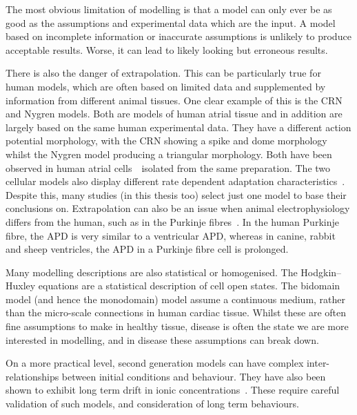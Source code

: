 The most obvious limitation of modelling is that a model can only ever be as
good as the assumptions and experimental data which are the input.
A model based on incomplete information or inaccurate assumptions is unlikely to
produce acceptable results.
Worse, it can lead to likely looking but erroneous results.

There is also the danger of extrapolation.
This can be particularly true for human models, which are often based on limited
data and supplemented by information from different animal tissues.
One clear example of this is the CRN and Nygren models.
Both are models of human atrial tissue and in addition are largely based on the
same human experimental data.
They have a different action potential morphology, with the CRN showing a spike
and dome morphology whilst the Nygren model producing a triangular morphology.
Both have been observed in human atrial cells~\cite{Wang1993}\ isolated from the
same preparation.
The two cellular models also display different rate dependent adaptation
characteristics~\cite{Cherry2007}.
Despite this, many studies (in this thesis too) select just one model to base
their conclusions on.
Extrapolation can also be an issue when animal electrophysiology differs from
the human, such as in the Purkinje fibres~\cite{Stewart2009}.
In the human Purkinje fibre, the APD is very similar to a ventricular APD,
whereas in canine, rabbit and sheep ventricles, the APD in a Purkinje fibre cell
is prolonged.

Many modelling descriptions are also statistical or homogenised.
The Hodgkin--Huxley equations are a statistical description of cell open states.
The bidomain model (and hence the monodomain) model assume a continuous medium,
rather than the micro-scale connections in human cardiac tissue.
Whilst these are often fine assumptions to make in healthy tissue, disease is
often the state we are more interested in modelling, and in disease these
assumptions can break down.

On a more practical level,  second generation models can have complex
inter-relationships between initial conditions and behaviour.
They have also been shown to exhibit long term drift in ionic
concentrations~\cite{Hund2001}.
These require careful validation of such models, and consideration of long term
behaviours.
